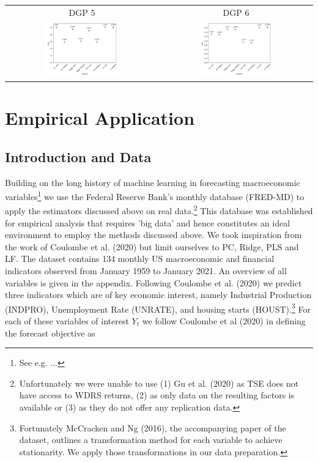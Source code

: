 \begin{table}[h! ]
\begin{tabular}{c c}
        DGP 5 & DGP 6 \\
        \includegraphics[width=0.5\textwidth]{figures/N200_T500_DGP5_Sims25} &
        \includegraphics[width=0.5\textwidth]{figures/N200_T500_DGP6_Sims25}
    \end{tabular}
\end{table}

\clearpage

\section{Empirical Application}
\subsection{Introduction and Data}
Building on the long history of machine learning in forecasting macroeconomic variables\footnote{See e.g. ...} we use the Federal Reserve Bank's monthly database (FRED-MD) to apply the estimators discussed above on real data.\footnote{Unfortunately we were unable to use (1) Gu et al. (2020) as TSE does not have access to WDRS returns, (2) as only data on the resulting factors is available or (3) as they do not offer any replication data.} This database was established for empirical analysis that requires 'big data' and hence constitutes an ideal environment to employ the methods discussed above. We took inspiration from the work of Coulombe et al. (2020) but limit ourselves to PC, Ridge, PLS and LF. 
The dataset contains 134 monthly US macroeconomic and financial indicators observed from January 1959 to January 2021. An overview of all variables is given in the appendix. 
Following Coulombe et al. (2020) we predict three indicators which are of key economic interest, namely Industrial Production (INDPRO), Unemployment Rate (UNRATE), and housing starts (HOUST).\footnote{Fortunately McCracken and Ng (2016), the accompanying paper of the dataset, outlines a transformation method for each variable to achieve stationarity. We apply those transformations in our data preparation.}
For each of these variables of interest $Y_t$ we follow Coulombe et al (2020) in defining the forecast objective as

